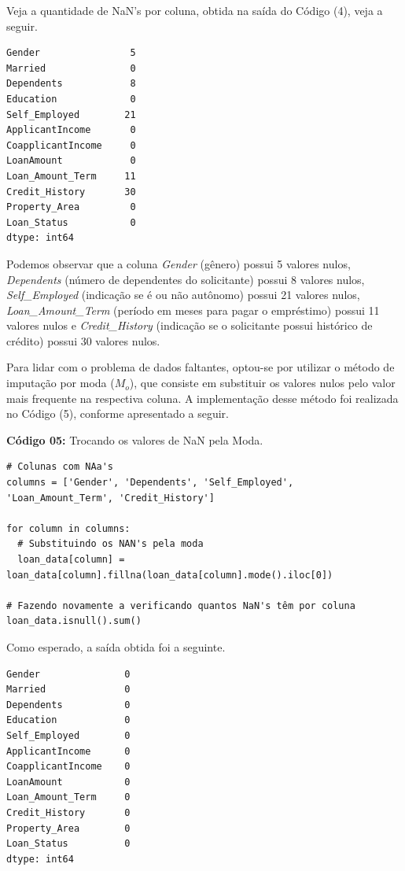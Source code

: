 \documentclass[a4paper,12pt]{article} %
\begin{document}
Veja a quantidade de NaN's por coluna, obtida na saída do Código (4), veja a seguir.
\begin{verbatim}
Gender                5
Married               0
Dependents            8
Education             0
Self_Employed        21
ApplicantIncome       0
CoapplicantIncome     0
LoanAmount            0
Loan_Amount_Term     11
Credit_History       30
Property_Area         0
Loan_Status           0
dtype: int64
\end{verbatim}

Podemos observar que a coluna \textit{Gender} (gênero) possui 5 valores nulos, \textit{Dependents} (número de dependentes do solicitante) possui 8 valores nulos, \textit{Self\_Employed} (indicação se é ou não autônomo) possui 21 valores nulos, \textit{Loan\_Amount\_Term} (período em meses para pagar o empréstimo) possui 11 valores nulos e \textit{Credit\_History} (indicação se o solicitante possui histórico de crédito) possui 30 valores nulos.

Para lidar com o problema de dados faltantes, optou-se por utilizar o método de imputação por moda ($M_o$), que consiste em substituir os valores nulos pelo valor mais frequente na respectiva coluna. A implementação desse método foi realizada no Código (5), conforme apresentado a seguir.

\begin{center}
\textbf{Código 05:} Trocando os valores de NaN pela Moda.
\begin{verbatim}
# Colunas com NAa's
columns = ['Gender', 'Dependents', 'Self_Employed', 'Loan_Amount_Term', 'Credit_History']

for column in columns:
  # Substituindo os NAN's pela moda
  loan_data[column] = loan_data[column].fillna(loan_data[column].mode().iloc[0])

# Fazendo novamente a verificando quantos NaN's têm por coluna
loan_data.isnull().sum()
\end{verbatim}
\end{center}

Como esperado, a saída obtida foi a seguinte.
\begin{verbatim}
Gender               0
Married              0
Dependents           0
Education            0
Self_Employed        0
ApplicantIncome      0
CoapplicantIncome    0
LoanAmount           0
Loan_Amount_Term     0
Credit_History       0
Property_Area        0
Loan_Status          0
dtype: int64
\end{verbatim}
\end{document}

